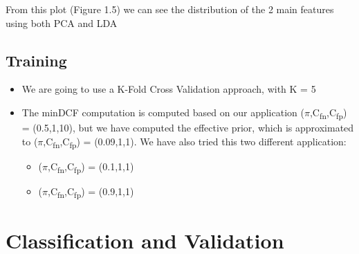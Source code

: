 \documentclass[english]{report}
\begin{document}
    From this plot (Figure 1.5) we can see the distribution of the 2 main features using both PCA and LDA

\section{Training}
    \begin{itemize}
        \item We are going to use a K-Fold Cross Validation approach, with K = 5
        \item The minDCF computation is computed based on our application ($\pi$,C\textsubscript{fn},C\textsubscript{fp}) = (0.5,1,10), but we have
        computed the effective prior, which is approximated to ($\pi$,C\textsubscript{fn},C\textsubscript{fp}) = (0.09,1,1).\newline
        We have also tried this two different application:
        \begin{itemize}
            \item ($\pi$,C\textsubscript{fn},C\textsubscript{fp}) = (0.1,1,1)
            \item ($\pi$,C\textsubscript{fn},C\textsubscript{fp}) = (0.9,1,1)
        \end{itemize}
    \end{itemize}

\chapter{Classification and Validation}
\end{document}
